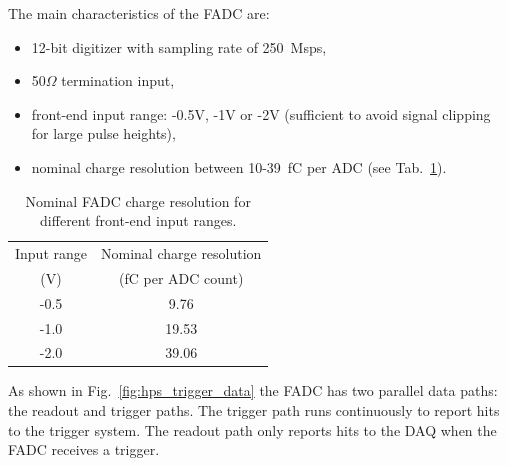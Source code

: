 The main characteristics of the FADC are:
\begin{itemize}
\item 12-bit digitizer with sampling rate of 250~Msps, 
\item 50$\Omega$ termination input, 
\item front-end input range:  -0.5V, -1V or -2V (sufficient to avoid signal clipping for large pulse heights),
\item nominal charge resolution between 10-39~fC per ADC (see Tab.~\ref{tab:charge_resolution}).
\end{itemize}
\begin{table}[h]
\centering
\begin{tabular}{|c|c|}
\hline
Input range & Nominal charge resolution\\
(V) & (fC per ADC count)\\\hline
-0.5 & 9.76  \\\hline
-1.0 & 19.53  \\\hline
-2.0 & 39.06 \\\hline
\end{tabular}
\caption{Nominal FADC charge resolution for different front-end input ranges.}
\label{tab:charge_resolution}
\end{table}
As shown in Fig.~\ref{fig:hps_trigger_data} the FADC has two parallel data paths: the readout and trigger paths. The trigger path runs continuously to report hits to the trigger system. The readout path only reports hits to the DAQ when the FADC receives a trigger.

